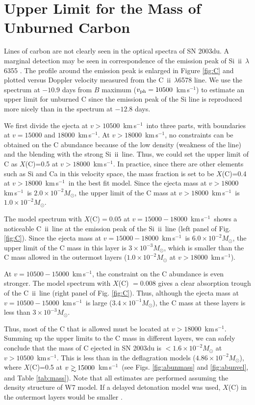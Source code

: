 \documentclass[usegraphicx,usenatbib]{mn2e}
\newcommand{\kms}{\mbox{\,km\,s$^{-1}$}}
\newcommand{\Msun}{M_{\odot}}
\newcommand{\CII}{C~{\sc ii}}
\newcommand{\SiII}{Si~{\sc ii}}
\def\gsim{\mathrel{\rlap{\lower 4pt \hbox{\hskip 1pt $\sim$}}\raise 1pt\hbox {$>$}}}
\begin{document}
\section{Upper Limit for the Mass of Unburned Carbon}
\label{app:C}

Lines of carbon are not clearly seen in the optical spectra of SN 2003du. A
marginal detection may be seen in correspondence of the emission peak of 
\SiII\ $\lambda$6355 \citep{stanishev07, tanaka08Ia}. The profile around
the emission peak is enlarged in Figure \ref{fig:C} and plotted versus Doppler
velocity measured from the \CII\ $\lambda$6578 line. We use the spectrum at
$-10.9$ days from $B$ maximum ($v_{\rm ph}=10500$ \kms) to estimate an upper
limit for unburned C since the emission peak of the Si line is reproduced more
nicely than in the spectrum at $-12.8$ days.

We first divide the ejecta at $v>10500$ \kms\ into three parts, with boundaries
at $v=15000$ and $18000$ \kms. At $v>18000$ \kms, no constraints can be obtained
on the C abundance because of the low density (weakness of the line) and the
blending with the strong \SiII\ line. Thus, we could set the upper limit of C as
$X$(C)=0.5 at $v>18000$ \kms. In practice, since there are other elements such 
as Si and Ca in this velocity space, 
the mass fraction is set to be $X$(C)=0.4 at $v>18000$ \kms\ in
the best fit model. Since the ejecta mass at $v>18000$ \kms\ is 
$2.0 \times 10^{-2} \Msun$, the upper limit of the C mass at $v>18000$ \kms\ is 
$1.0 \times 10^{-2} \Msun$.

The model spectrum with $X$(C)$=0.05$ at $v=15000-18000$ \kms\ shows a
noticeable \CII\ line at the emission peak of the \SiII\ line (left panel of
Fig. \ref{fig:C}). Since the ejecta mass at $v=15000-18000$ \kms\ is 
$6.0 \times 10^{-2} \Msun$, the upper limit of the C mass in this layer is 
$3 \times 10^{-3}
\Msun$, which is smaller than the C mass allowed in the outermost layers 
($1.0 \times 10^{-2} \Msun$ at $v>18000$ \kms).

At $v=10500-15000$ \kms, the constraint on the C abundance is even stronger. The
model spectrum with $X$(C) $=0.008$ gives a clear absorption trough of the \CII\
line (right panel of Fig. \ref{fig:C}). Thus, although the ejecta mass at 
$v=10500-15000$ \kms\ is large ($3.4 \times 10^{-1}\Msun$), the C mass at these
layers is less than $3 \times 10^{-3} \Msun$.

Thus, most of the C that is allowed must be located at $v>18000$ \kms.  Summing
up the upper limits to the C mass in different layers, we can safely conclude
that the mass of C ejected in SN 2003du is  $<1.6 \times 10^{-2} \Msun$ at $v >
10500$ \kms. This is less than in the deflagration models  ($4.86 \times 10^{-2}
\Msun$), where $X$(C)=0.5 at $v \gsim 15000$ \kms\ (see Figs. \ref{fig:abunmass}
and \ref{fig:abunvel}, and Table \ref{tab:mass}). Note that all estimates are
performed assuming the density structure of W7 model. If a delayed
detonation model was used, $X$(C) in the outermost layers would be smaller
\citep{tanaka08Ia}.
\end{document}
